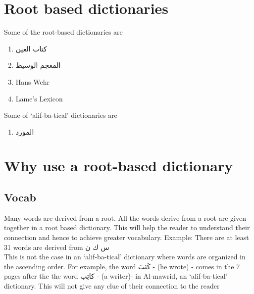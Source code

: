 \section{Root based dictionaries}

Some of the root-based dictionaries are
\begin{enumerate}	    %
	\item \textarabic{كتاب العين}
	\item \textarabic{المعجم الوسيط}
	\item Hans Wehr
	\item Lame's Lexicon
\end{enumerate}

\noindent Some of `alif-ba-tical' dictionaries are
\begin{enumerate}	    %
	\item \textarabic{المورد}
\end{enumerate}

\section{Why use a root-based dictionary}
\subsection{Vocab}
Many words are derived from a root. 
All the words derive from a root are given together in a root based dictionary. This will help the reader to understand their connection and hence to achieve greater vocabulary. 
Example: There are at least 31 words are derived from \textarabic{س ك ن}  \\

This is not the case in an `alif-ba-tical' dictionary where words are organized in the ascending order.
For example, the word  \textarabic{كَتَبَ} - (he wrote) - comes in the 7 pages after the  the word 	 \textarabic{كاتِب} - (a writer)-  in \textarabic{Al-mawrid}, an `alif-ba-tical' dictionary. This will not give any clue of their connection to the reader



